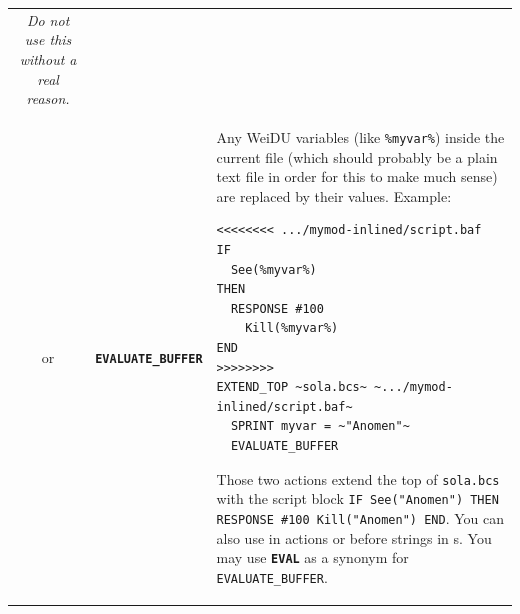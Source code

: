 \documentclass{article}
\def\ttref#1{\ahrefloc{#1}{\tt #1}}
\def\DEFINE#1{{\tt \bf #1}\label{#1}\index{#1}}
\def\t#1{{\tt #1}}
\begin{document}
\begin{tabular}{cp{10in}|p{10in}}
	\emph{Do not use this without a real reason.}
\\
or & \DEFINE{EVALUATE_BUFFER} &
  Any WeiDU variables (like \t{\%myvar\%}) inside the current file (which
  should probably be a plain text file in order for this to make much sense)
  are replaced by their values. Example:
\begin{verbatim}
<<<<<<<< .../mymod-inlined/script.baf
IF
  See(%myvar%)
THEN
  RESPONSE #100
    Kill(%myvar%)
END
>>>>>>>>
EXTEND_TOP ~sola.bcs~ ~.../mymod-inlined/script.baf~
  SPRINT myvar = ~"Anomen"~
  EVALUATE_BUFFER
\end{verbatim}
  Those two actions extend the top of \t{sola.bcs} with the script
  block \t{IF See("Anomen") THEN RESPONSE \#100 Kill("Anomen") END}.
  You can also use \ttref{EVALUATE_BUFFER} in \ttref{COMPILE} actions
  or before strings in \ttref{value}s. You may use \DEFINE{EVAL} as
  a synonym for \t{EVALUATE_BUFFER}.
  \\


\end{tabular}
\end{document}
